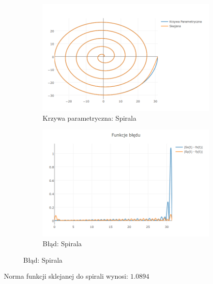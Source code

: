 \documentclass{article}
\begin{document}
	\begin{figure}[h]
	\centering
		\begin{subfigure}{.44\textwidth}
			\includegraphics[width=\textwidth]{newplot(4).png}
			\caption{Krzywa parametryczna: Spirala}
			\label{Wykres:Spirala}
		\end{subfigure}
		\begin{subfigure}{.44\textwidth}
			\includegraphics[width=\textwidth]{newplot(5).png}
			\caption{Błąd: Spirala}
			\label{Blad:Spirala}
		\end{subfigure}
	\end{figure}

Norma funkcji sklejanej do spirali wynosi: $1.0894$
\end{document}

